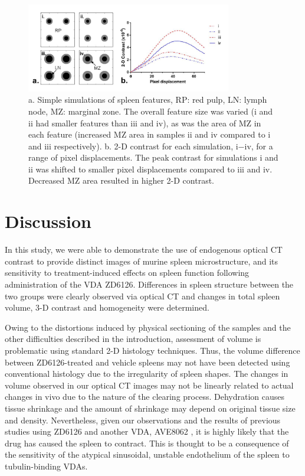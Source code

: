 	\begin{figure}%
		\centering
		\includegraphics[width=0.8\textwidth]{spleen_img/spleen_Figure6.jpg}
		\caption{a. Simple simulations of spleen features, RP: red pulp, LN: lymph node, MZ: marginal zone. The overall feature size was varied (i and ii had smaller features than iii and iv), as was the area of MZ in each feature (increased MZ area in samples ii and iv compared to i and iii respectively). b. 2-D contrast for each simulation, i−iv, for a range of pixel displacements. The peak contrast for simulations i and ii was shifted to smaller pixel displacements compared to iii and iv. Decreased MZ area resulted in higher 2-D contrast.}
		\label{fig:6}
	\end{figure}
	
	
	
	\section{Discussion}
	In this study, we were able to demonstrate the use of endogenous optical CT contrast to provide distinct images of murine spleen microstructure, and its sensitivity to treatment-induced effects on spleen function following administration of the VDA ZD6126. Differences in spleen structure between the two groups were clearly observed via optical CT and changes in total spleen volume, 3-D contrast and homogeneity were determined.
	
	Owing to the distortions induced by physical sectioning of the samples and the other difficulties described in the introduction, assessment of volume is problematic using standard 2-D histology techniques. Thus, the volume difference between ZD6126-treated and vehicle spleens may not have been detected using conventional histology due to the irregularity of spleen shapes. The changes in volume observed in our optical CT images may not be linearly related to actual changes in vivo due to the nature of the clearing process. Dehydration causes tissue shrinkage and the amount of shrinkage may depend on original tissue size and density. Nevertheless, given our observations and the results of previous studies using ZD6126 and another VDA, AVE8062 \cite{cullistumour2006, guffroyevaluation2004}, it is highly likely that the drug has caused the spleen to contract. This is thought to be a consequence of the sensitivity of the atypical sinusoidal, unstable endothelium of the spleen \cite{groomthe1987} to tubulin-binding VDAs. 
	
